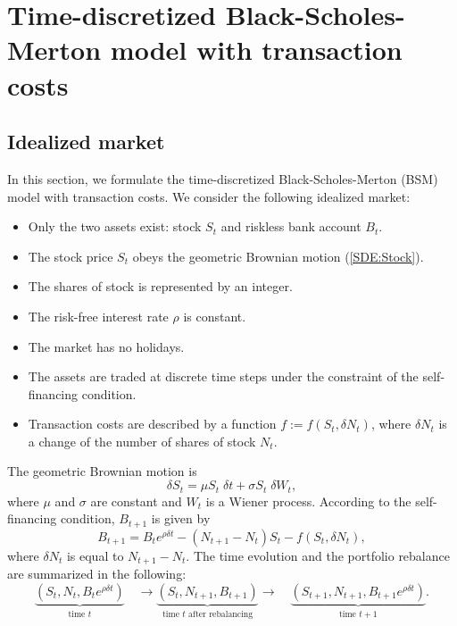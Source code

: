 \documentclass[11pt]{article}
\begin{document}
\vspace{1zw}

\section{Time-discretized Black-Scholes-Merton model with transaction costs}

\subsection{Idealized market}

In this section, we formulate the time-discretized Black-Scholes-Merton (BSM) model with transaction costs. We consider the following idealized market:

\begin{itemize}
	\item Only the two assets exist: stock $S_t$ and riskless bank account $B_t$.
	\item The stock price $S_t$ obeys the geometric Brownian motion (\ref{SDE:Stock}).
	\item The shares of stock is represented by an integer.
	\item The risk-free interest rate $\rho$ is constant.
	\item The market has no holidays.
	\item The assets are traded at discrete time steps under the constraint of the self-financing condition.
	\item Transaction costs are described by a function $f := f(S_t, \delta N_t)$, where $\delta N_t$ is a change of the number of shares of stock $N_t$.
\end{itemize}

The geometric Brownian motion is
%
\begin{equation}
	\delta S_{t} = \mu S_t \; \delta t + \sigma S_t \; \delta W_t \label{SDE:Stock},
\end{equation}
%
where $\mu$ and $\sigma$ are constant and $W_t$ is a Wiener process. According to the self-financing condition, $B_{t+1}$ is given by
%
\begin{equation}
	B_{t+1} = B_t e^{\rho \delta t} - (N_{t+1} - N_{t}) S_t - f(S_t, \delta N_t), \label{Bt:self:financing}
\end{equation}
%
where $\delta N_t$ is equal to $N_{t+1} - N_{t}$. The time evolution and the portfolio rebalance are summarized in the following:
%
\begin{equation}
	\underbrace{(S_t, N_t, B_t e^{\rho \delta t})}_{\text{time } t} \quad \rightarrow \underbrace{(S_t, N_{t+1}, B_{t+1})}_{\text{time } t \text{ after rebalancing}} \rightarrow \quad \underbrace{(S_{t+1}, N_{t+1}, B_{t+1} e^{\rho \delta t})}_{\text{time } t+1}. \label{portfolio:evolution}
\end{equation}
\end{document}

